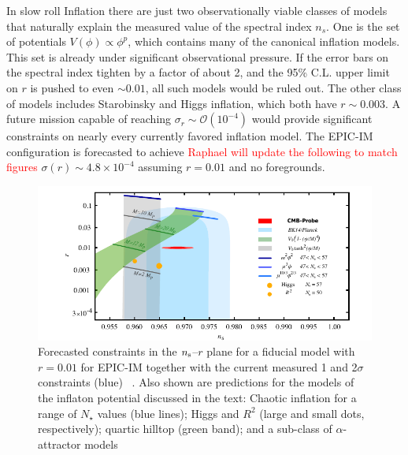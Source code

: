 In slow roll Inflation there are just two observationally viable classes of models that naturally explain the measured value of the spectral index $n_s$. One is the set of potentials $V(\phi)\propto\phi^p$, which contains many of the canonical inflation models. This 
set is already under significant observational pressure. If the error bars on the spectral index tighten by a factor of about 2, 
and the 95\% C.L. upper limit on $r$ is pushed to even $\sim0.01$, all such models would be ruled out. 
The other class of models includes Starobinsky and Higgs inflation, which both have $r\sim0.003$. A future mission 
capable of reaching $\sigma_r\sim\mathcal{O}(10^{-4})$ would provide significant constraints on nearly every currently favored 
inflation model. The EPIC-IM configuration is forecasted to achieve \textcolor{red}{Raphael will update the following to match figures} $\sigma(r)\sim4.8 \times 10^{-4}$ assuming $r=0.01$ 
and no foregrounds.
\begin{figure}[ht!]
\hspace{-0.2in}
\parbox{4.in}{\centerline {
\includegraphics[width=4.5in]{figs/nsrlabeledrp01v1} } }
\hspace{-0.05in}
\parbox{2.5in}{
\caption{ \small \setlength{\baselineskip}{0.95\baselineskip}
Forecasted constraints in the $n_{\rm s}$--$r$ plane for a fiducial model with $r=0.01$ for EPIC-IM together 
with the current measured 1 and 2$\sigma$ constraints (blue) ~\cite{Array:2015xqh}. Also shown are predictions 
for the models of the inflaton potential discussed in the text: Chaotic inflation for a range of $N_\star$ values (blue lines); 
Higgs and $R^2$ (large and small dots, respectively);  quartic hilltop (green band); and a sub-class of $\alpha$-attractor
models~\cite{Kallosh:2013hoa}
\label{fig:nsrp01} } }
\vspace{-0.1in}
\end{figure}

